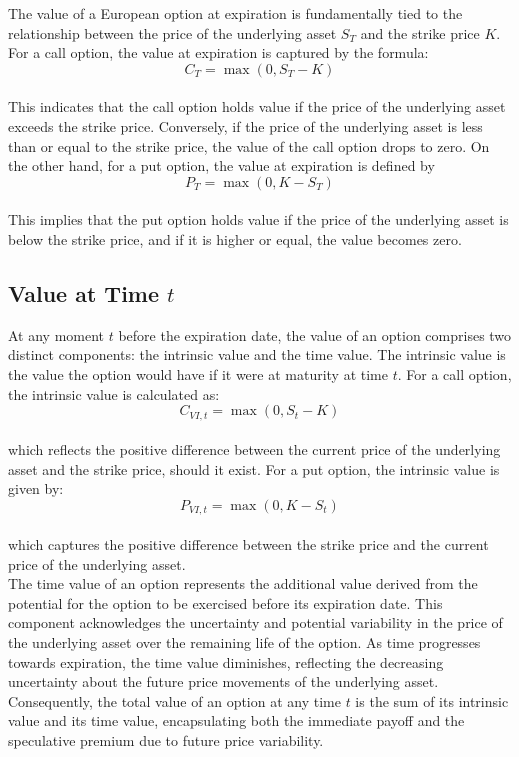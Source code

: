 \documentclass[a4paper,10pt]{article}
\begin{document}
        \noindent The value of a European option at expiration is fundamentally tied to the relationship between the price of the underlying asset \( S_T \) and the strike price \( K \). For a call option, the value at expiration is captured by the formula:\\\[ C_T = \max(0, S_T - K) \]\\ This indicates that the call option holds value if the price of the underlying asset exceeds the strike price. Conversely, if the price of the underlying asset is less than or equal to the strike price, the value of the call option drops to zero. On the other hand, for a put option, the value at expiration is defined by \\\[ P_T = \max(0, K - S_T) \]\\ This implies that the put option holds value if the price of the underlying asset is below the strike price, and if it is higher or equal, the value becomes zero. \\
        
    \subsection*{Value at Time \( t \)}

        \noindent At any moment \( t \) before the expiration date, the value of an option comprises two distinct components: the intrinsic value and the time value. The intrinsic value is the value the option would have if it were at maturity at time \( t \). For a call option, the intrinsic value is calculated as: \\\[ C_{VI,t} = \max(0, S_t - K) \]\\ which reflects the positive difference between the current price of the underlying asset and the strike price, should it exist. For a put option, the intrinsic value is given by: \\\[ P_{VI,t} = \max(0, K - S_t) \]\\ which captures the positive difference between the strike price and the current price of the underlying asset. \\

        \noindent The time value of an option represents the additional value derived from the potential for the option to be exercised before its expiration date. This component acknowledges the uncertainty and potential variability in the price of the underlying asset over the remaining life of the option. As time progresses towards expiration, the time value diminishes, reflecting the decreasing uncertainty about the future price movements of the underlying asset. Consequently, the total value of an option at any time \( t \) is the sum of its intrinsic value and its time value, encapsulating both the immediate payoff and the speculative premium due to future price variability. \\
       
\end{document}

